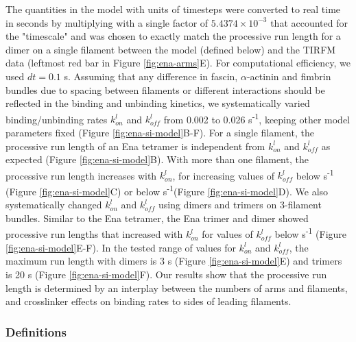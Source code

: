 The quantities in the model with units of timesteps were converted to real time in seconds by multiplying with a single factor of $5.4374 \times 10^{-3}$ that accounted for the "timescale" and was chosen to exactly match the processive run length for a dimer on a single filament between the model (defined below) and the TIRFM data (leftmost red bar in Figure \ref{fig:ena-arms}E). For computational efficiency, we used $dt = 0.1$ s.
	Assuming that any difference in fascin, $\alpha$-actinin and fimbrin bundles due to spacing between filaments or different interactions should be reflected in the binding and unbinding kinetics, we systematically varied binding/unbinding rates $k_{on}^{l}$ and $k_{off}^{l}$ from 0.002 to 0.026 s\textsuperscript{-1}, keeping other model parameters fixed (Figure \ref{fig:ena-si-model}B-F). For a single filament, the processive run length of an Ena tetramer is independent from $k_{on}^{l}$ and $k_{off}^{l}$ as expected (Figure \ref{fig:ena-si-model}B). With more than one filament, the processive run length increases with $k_{on}^{l}$, for increasing values of $k_{off}^{l}$ below  s\textsuperscript{-1} (Figure \ref{fig:ena-si-model}C) or below  s\textsuperscript{-1}(Figure \ref{fig:ena-si-model}D). We also systematically changed $k_{on}^{l}$ and $k_{off}^{l}$ using dimers and trimers on 3-filament bundles. Similar to the Ena tetramer, the Ena trimer and dimer showed processive run lengths that increased with $k_{on}^{l}$ for values of $k_{off}^{l}$ below  s\textsuperscript{-1} (Figure \ref{fig:ena-si-model}E-F). In the tested range of values for $k_{on}^{l}$ and $k_{off}^{l}$, the maximum run length with dimers is 3 s (Figure \ref{fig:ena-si-model}E) and trimers is 20 s (Figure \ref{fig:ena-si-model}F). Our results show that the processive run length is determined by an interplay between the numbers of arms and filaments, and crosslinker effects on binding rates to sides of leading filaments.
    
\subsubsection{Definitions}\label{ena-si-definitions}

